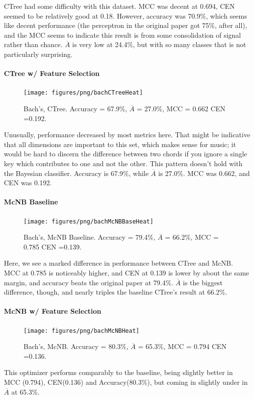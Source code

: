 	CTree had some difficulty with this dataset.  MCC was decent at 0.694, CEN seemed to be relatively good at 0.18.    However, accuracy was 70.9\%, which seems like decent performance (the perceptron in the original paper got 75\%, after all), and the MCC seems to indicate this result is from some consolidation of signal rather than chance.  $\overline{A}$ is very low at 24.4\%, but with so many classes that is not particularly surprising.  
\paragraph{CTree w/ Feature Selection}	
\begin{figure}
	
	\centering
\texttt{[image: figures/png/bachCTreeHeat]}
\caption[Bach's Chorales Classification Tree with Feature Selection]{Bach's, CTree. Accuracy = 67.9\%, $\overline{A}$ = 27.0\%, MCC = 0.662 CEN =0.192.  }
\label{fig:bachctreeheat}
\end{figure}
Unusually, performance decreased by most metrics here.  That might be indicative that all dimensions are important to this set, which makes sense for music; it would be hard to discern the difference between two chords if you ignore a single key which contributes to one and not the other.  This pattern doesn't hold with the Bayesian classifier.  Accuracy is 67.9\%, while $\overline{A}$ is 27.0\%.    MCC was 0.662, and CEN was 0.192.
\paragraph{McNB Baseline}
\begin{figure}
		\centering
\texttt{[image: figures/png/bachMcNBBaseHeat]}
\caption[Bach's Chorales Na\"ive Bayes without Feature Selection]{Bach's, McNB Baseline. Accuracy = 79.4\%, $\overline{A}$ = 66.2\%, MCC = 0.785 CEN =0.139.  }
\label{fig:bachmcnbbaseheat}

\end{figure}
Here, we see a marked difference in performance between CTree and McNB.  MCC at 0.785 is noticeably higher, and CEN at 0.139 is lower by about the same margin, and accuracy beats the original paper at 79.4\%.  $\overline{A}$ is the biggest difference, though, and nearly triples the baseline CTree's result at 66.2\%.
\paragraph{McNB w/ Feature Selection}
\begin{figure}
	\centering
	\texttt{[image: figures/png/bachMcNBHeat]}
	\caption[Bach's Chorales Na\"ive Bayes with Feature Selection]{Bach's, McNB. Accuracy = 80.3\%, $\overline{A}$ = 65.3\%, MCC = 0.794 CEN =0.136.  }
	\label{fig:bachmcnbheat}
	
\end{figure}This optimizer performs comparably to the baseline, being slightly better in MCC (0.794), CEN(0.136) and Accuracy(80.3\%), but coming in slightly under in $\overline{A}$ at 65.3\%.  
